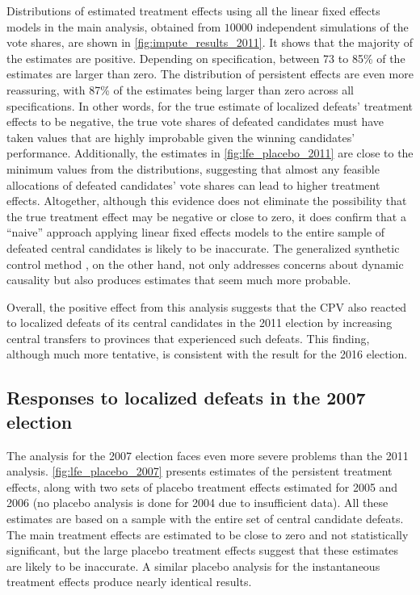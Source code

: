 \documentclass[12pt]{article}
\newcommand{\1}{\mathbbm{1}}
\begin{document}
Distributions of estimated treatment effects using all the linear fixed effects models in the main analysis, obtained from $10000$ independent simulations of the vote shares, are shown in \autoref{fig:impute_results_2011}. It shows that the majority of the estimates are positive. Depending on specification, between 73 to 85\% of the estimates are larger than zero. The distribution of persistent effects are even more reassuring, with 87\% of the estimates being larger than zero across all specifications. In other words, for the true estimate of localized defeats' treatment effects to be negative, the true vote shares of defeated candidates must have taken values that are highly improbable given the winning candidates' performance. Additionally, the estimates in \autoref{fig:lfe_placebo_2011} are close to the minimum values from the distributions, suggesting that almost any feasible allocations of defeated candidates' vote shares can lead to higher treatment effects. Altogether, although this evidence does not eliminate the possibility that the true treatment effect may be negative or close to zero, it does confirm that a ``naive'' approach applying linear fixed effects models to the entire sample of defeated central candidates is likely to be inaccurate. The generalized synthetic control method \citep{Xu2017gsynth}, on the other hand, not only addresses concerns about dynamic causality but also produces estimates that seem much more probable. 

Overall, the positive effect from this analysis suggests that the CPV also reacted to localized defeats of its central candidates in the 2011 election by increasing central transfers to provinces that experienced such defeats. This finding, although much more tentative, is consistent with the result for the 2016 election.
 
\subsection{Responses to localized defeats in the 2007 election}

The analysis for the 2007 election faces even more severe problems than the 2011 analysis. \autoref{fig:lfe_placebo_2007} presents estimates of the persistent treatment effects, along with two sets of placebo treatment effects estimated for 2005 and 2006 (no placebo analysis is done for 2004 due to insufficient data). All these estimates are based on a sample with the entire set of central candidate defeats. The main treatment effects are estimated to be close to zero and not statistically significant, but the large placebo treatment effects suggest that these estimates are likely to be inaccurate. A similar placebo analysis for the instantaneous treatment effects produce nearly identical results.
\end{document}

